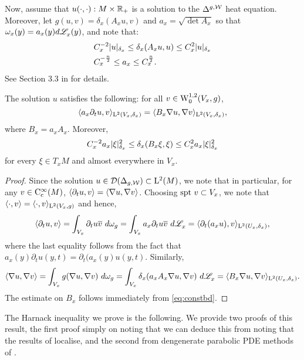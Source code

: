 \documentclass[a4paper, 12pt]{amsart}
\begin{document}
Now, assume that $u(\cdot, \cdot): M \times \R_+$ 
is a solution to the $\Delta^{g,\cW}$ heat equation.
Moreover, let $g(u,v) = \delta_x(A_x u,v)$
and $a_x = \sqrt{\det A_x}$ so that
$\omega_x(y) = a_x(y)d\Leb_x(y)$, and note
that:
\begin{equation}
\label{eq:constbd}
\begin{split}
&C_x^{-2} \modulus{u}_{\delta_x} \leq \delta_x(A_x u, u) \leq C_x^2 \modulus{u}_{\delta_x} \\
&C_x^{-\frac{n}{2}} \leq a_x \leq C_x^{\frac{n}{2}}.
\end{split}
\end{equation}
See Section 3.3 in \cite{BRough} for details. 

\begin{lemma}
\label{eq:soln1}
The solution $u$ satisfies the following: for all $v \in \SobH[0]{1}(V_x,g)$, 
	\begin{equation} 
	\label{eq:testfn1}	 
	\inprod{a_x \partial_t u, v}_{\Lp{2}(V_x, \delta_x)} 
		= \inprod{ B_x \nabla u, \nabla v}_{\Lp{2}(V_x, \delta_x)},
	\end{equation}
where $B_x = a_x A_x$. Moreover,
\begin{equation}
\label{eq:coeff}
C_x^{-2} a_x \modulus{\xi}_{\delta_x}^2 \leq \delta_x(B_x \xi, \xi) 
	\leq C_x^2 a_x \modulus{\xi}_{\delta_x}^2
\end{equation} 
for every $\xi \in T_xM$ and almost everywhere in $V_x$. 
\end{lemma}
\begin{proof}
Since the solution $u \in \dom(\Delta_{g,\cW}) \subset \Lp{2}(M)$, we
note that in particular, for any $v \in \Ck[c]{\infty}(M)$, 
$\inprod{\partial_t u, v} = \inprod{\nabla u, \nabla v}$.
Choosing $\spt v \subset V_x$, we note that $\inprod{\cdot, v} = \inprod{\cdot, v}_{\Lp{2}(V_x,g)}$
and hence,
$$\inprod{\partial_t u, v} = \int_{V_x} \partial_t u\conj{v}\ d\omega_g 
	= \int_{V_x} a_x \partial_t  u \conj{v}\ d\Leb_x
	= \inprod{\partial_t (a_x u), v}_{\Lp{2}(U_x, \delta_x)},$$
where the last equality follows from the fact that 
$a_x(y) \partial_t u(y,t) = \partial_t (a_x(y)u(y,t).$
Similarly,
$$\inprod{\nabla u, \nabla v} 
	= \int_{V_x} g(\nabla u, \nabla v)\ d\omega_g
	= \int_{V_x} \delta_x(a_x A_x \nabla u, \nabla v)\ d\Leb_x
	= \inprod{B_x \nabla u, \nabla v}_{\Lp{2}(U_x, \delta_x)}.$$
The estimate on $B_x$ follows immediately from
\eqref{eq:constbd}.
\end{proof} 

The Harnack inequality we prove is the following. We provide two proofs of this result, 
the first proof simply on noting that we can deduce this from noting that the results
of \cite{SC} localise, and the second from dengenerate parabolic PDE methods of \cite{CS}.
\end{document}

